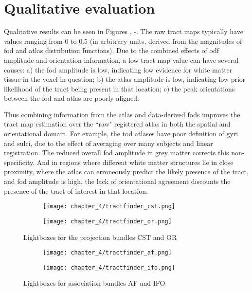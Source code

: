 \section{Qualitative evaluation}

Qualitative results can be seen in Figures , -.
The raw tract maps typically have values ranging from 0 to 0.5 (in arbitrary units, derived from the magnitudes of \gls{fod} and atlas distribution functions).
Due to the combined effects of \gls{odf} amplitude and orientation information, a low tract map value can have several causes: a) the \gls{fod} amplitude is low, indicating low evidence for white matter tissue in the voxel in question; b) the atlas amplitude is low, indicating low prior likelihood of the tract being present in that location; c) the peak orientations between the \gls{fod} and atlas are poorly aligned.

Thus combining information from the atlas and data-derived \gls{fod}s improves the tract map estimation over the ``raw" registered atlas in both the spatial and orientational domain. For example, the \gls{tod} atlases have poor definition of gyri and sulci, due to the effect of averaging over many subjects and linear registration. The reduced overall \gls{fod} amplitude in grey matter corrects this non-specificity. And in regions where different white matter structures lie in close proximity, where the atlas can erroneously predict the likely presence of the tract, and \gls{fod} amplitude is high, the lack of orientational agreement discounts the presence of the tract of interest in that location.

\begin{figure}[htb!]
  \begin{subfigure}{\textwidth}
    \texttt{[image: chapter\_4/tractfinder\_cst.png]}
    \caption{}
    \label{}
  \end{subfigure}
  \begin{subfigure}{\textwidth}
    \texttt{[image: chapter\_4/tractfinder\_or.png]}
    \caption{}
    \label{}
  \end{subfigure}
  \caption{Lightboxes for the projection bundles CST and OR}
  \label{fig:lbcstor}
\end{figure}
\begin{figure}[htb!]
  \begin{subfigure}{\textwidth}
    \texttt{[image: chapter\_4/tractfinder\_af.png]}
    \caption{}
    \label{}
  \end{subfigure}
  \begin{subfigure}{\textwidth}
    \texttt{[image: chapter\_4/tractfinder\_ifo.png]}
    \caption{}
    \label{}
  \end{subfigure}
  \caption{Lightboxes for association bundles AF and IFO}
  \label{fig:lbcstor}
\end{figure}

